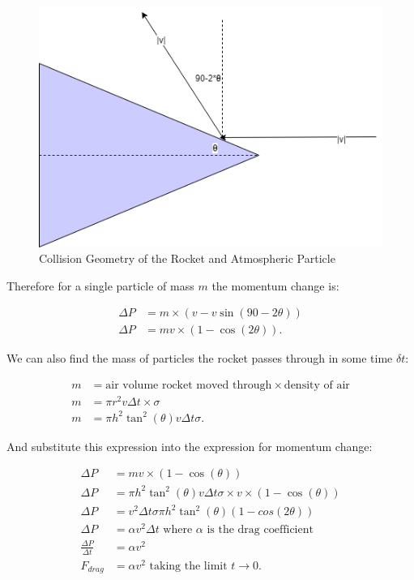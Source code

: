 \documentclass[]{article}
\begin{document}
\begin{figure}[h]
	\begin{center}
		\caption{Collision Geometry of the Rocket and Atmospheric Particle}
		\label{collision}
		\includegraphics[scale=0.5]{collision.png}
	\end{center}
\end{figure}


Therefore for a single particle of mass $m$ the momentum change is:
\begin{center}
	\begin{align*}
	\Delta P &= m\times (v-v\sin(90-2\theta)) \\
	\Delta P &= mv\times(1-\cos(2\theta)) .
	\end{align*}
\end{center}

We can also find the mass of particles the rocket passes through in some time $\delta t$:

\begin{center}
	\begin{align*}
	m &= \text{air volume rocket moved through}\times \text{density of air} \\
	m &= \pi r^2 v \Delta t \times \sigma \\
	m &= \pi h^2 \tan^2(\theta) v \Delta t \sigma .
	\end{align*}
\end{center}

And substitute this expression into the expression for momentum change:

\begin{center}
	\begin{align*}
	\Delta P &= mv\times(1-\cos(\theta)) \\
	\Delta P &= \pi h^2 \tan^2(\theta) v \Delta t \sigma \times v\times(1-\cos(\theta)) \\
	\Delta P &= v^2 \Delta t \sigma \pi h^2 \tan^2(\theta) (1-cos(2\theta)) \\
	\Delta P &= \alpha v^2 \Delta t \text{  where $\alpha$ is the drag coefficient} \\
	\frac{\Delta P}{\Delta t} &= \alpha v^2 \\
	F_{drag} &= \alpha v^2 \text{  taking the limit $t\rightarrow 0$} .
	\end{align*}
\end{center}
\end{document}

